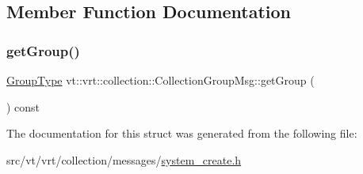 \subsection{Member Function Documentation}
\mbox{\label{structvt_1_1vrt_1_1collection_1_1_collection_group_msg_a109efca9965d4d4353d6b0a317297600}} 
\subsubsection{\texorpdfstring{get\+Group()}{getGroup()}}
{\footnotesize\ttfamily \hyperlink{namespacevt_a27b5e4411c9b6140c49100e050e2f743}{Group\+Type} vt\+::vrt\+::collection\+::\+Collection\+Group\+Msg\+::get\+Group (\begin{DoxyParamCaption}{ }\end{DoxyParamCaption}) const\hspace{0.3cm}{\ttfamily [inline]}}



The documentation for this struct was generated from the following file\+:\begin{DoxyCompactItemize}
\item 
src/vt/vrt/collection/messages/\hyperlink{system__create_8h}{system\+\_\+create.\+h}\end{DoxyCompactItemize}
